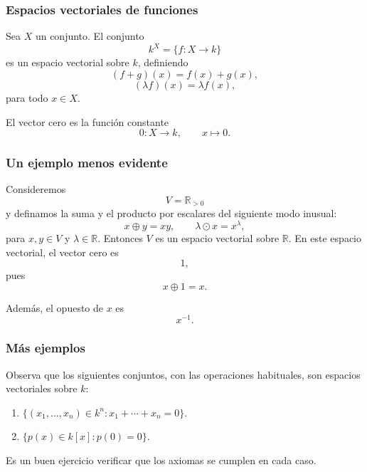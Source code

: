 \begin{frame}
    \frametitle{Espacios vectoriales de funciones}

    \begin{example}
        Sea \(X\) un conjunto. El conjunto
        \[
            k^X=\{f\colon X\longrightarrow k\}
        \]
        es un espacio vectorial sobre \(k\), definiendo
        \[
            (f+g)(x)=f(x)+g(x),
        \]
        \[
            (\lambda f)(x)=\lambda f(x),
        \]
        para todo \(x\in X\).
    \end{example}

    \medskip

    El vector cero es la función constante
    \[
        0\colon X\longrightarrow k,
        \qquad
        x\longmapsto 0.
    \]
\end{frame}

\begin{frame}
    \frametitle{Un ejemplo menos evidente}

    \begin{example}
        Consideremos
        \[
            V=\mathbb{R}_{>0}
        \]
        y definamos la \alert{suma} y el \alert{producto por escalares} del siguiente modo inusual:
        \[
            x\oplus y=xy,
            \qquad
            \lambda\odot x=x^\lambda,
        \]
        para \(x,y\in V\) y \(\lambda\in\mathbb{R}\). Entonces \(V\) es un espacio vectorial sobre \(\mathbb{R}\). En este espacio vectorial, el vector cero es
    \[
        1,
    \]
    pues
    \[
        x\oplus 1=x.
    \]

    Además, el opuesto de \(x\) es
    \[
        x^{-1}.
    \]
        \end{example}
\end{frame}


\begin{frame}
    \frametitle{Más ejemplos}

    Observa que los siguientes conjuntos, con las operaciones habituales,
    son espacios vectoriales sobre \(k\):

    \begin{enumerate}
        \item
        \(
            \{(x_1,\ldots,x_n)\in k^n:
            x_1+\cdots+x_n=0\}.
        \)

        \item
        \(
            \{p(x)\in k[x]:p(0)=0\}.
        \)
    \end{enumerate}

    \medskip

	Es un buen ejercicio verificar que los axiomas se cumplen en cada caso.
\end{frame}

